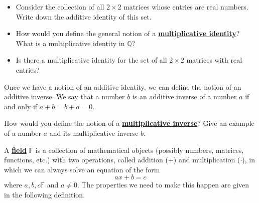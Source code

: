 \documentclass[11pt]{article}
\newenvironment{task}
	{\begin{mdframed}[linecolor=lightgray, linewidth=3pt]\raggedright}
	{\end{mdframed}}
\renewcommand\emph[1]{\underline{\bf{#1}}} %
\theoremstyle{definition}
\begin{document}
\begin{task}
  \begin{itemize}
    \item Consider the collection of all $2\times 2$ matrices whose entries are real numbers. Write down the additive identity of this set.
    \item How would you define the general notion of a \emph{multiplicative identity}? What is a multiplicative identity in $\mathbb{Q}$?
    \item Is there a multiplicative identity for the set of all $2\times 2$ matrices with real entries?
  \end{itemize}
\end{task}

Once we have a notion of an additive identity, we can define the notion of an additive inverse. We say that 
a number $b$ is an additive inverse of a number $a$ if and only if $a+b=b+a = 0$. 

\begin{task}
  How would you define the notion of a \emph{multiplicative inverse}? Give an example of a number $a$ and its 
  multiplicative inverse $b$.
\end{task}

A \emph{field} $\mathbb{F}$ is a collection of mathematical objects (possibly numbers, matrices, functions, etc.) with two operations, called
addition ($+$) and multiplication ($\cdot$), in which we can always solve an equation of the form
\[ ax + b = c\]
where $a,b,c\mathbb{F}$ and $a \neq 0$. The properties we need to make this happen are given in the following definition.
\end{document}
